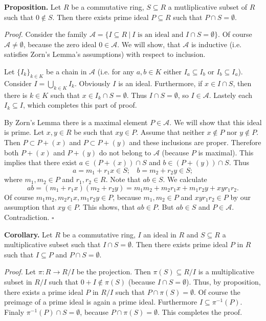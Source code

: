 \documentclass[12pt]{article}
\begin{document}
\textbf{Proposition.} Let $R$ be a commutative ring, $S\subseteq R$ a mutliplicative subset of $R$ such that $0\not\in S$. Then there exists prime ideal $P\subseteq R$ such that $P\cap S=\emptyset$.

\textit{Proof.} Consider the family $\mathcal{A}=\{I\subseteq R\ |\ I\mbox{ is an ideal and }I\cap S=\emptyset\}$. Of course $\mathcal{A}\neq\emptyset$, because the zero ideal $0\in\mathcal{A}$. We will show, that $\mathcal{A}$ is inductive (i.e. satisfies Zorn's Lemma's assumptions) with respect to inclusion.

Let $\{I_k\}_{k\in K}$ be a chain in $\mathcal{A}$ (i.e. for any $a,b\in K$ either $I_a\subseteq I_b$ or $I_b\subseteq I_a$). Consider $I=\bigcup_{k\in K}I_{k}$. Obviously $I$ is an ideal. Furthermore, if $x\in I\cap S$, then there is $k\in K$ such that $x\in I_k\cap S=\emptyset$. Thus $I\cap S=\emptyset$, so $I\in\mathcal{A}$. Lastely each $I_k\subseteq I$, which completes this part of proof.

By Zorn's Lemma there is a maximal element $P\in\mathcal{A}$. We will show that this ideal is prime. Let $x,y\in R$ be such that $xy\in P$. Assume that neither $x\not\in P$ nor $y\not\in P$. Then $P\subset P+(x)$ and $P\subset P+(y)$ and these inclusions are proper. Therefore both $P+(x)$ and $P+(y)$ do not belong to $\mathcal{A}$ (because $P$ is maximal). This implies that there exist $a\in (P+(x))\cap S$ and $b\in (P+(y))\cap S$. Thus
$$a=m_1+r_1x\in S;\ \ \ \ b=m_2+r_2y\in S;$$
where $m_1,m_2\in P$ and $r_1,r_2\in R$. Note that $ab\in S$. We calculate
$$ab=(m_1+r_1x)(m_2+r_2y)=m_1m_2+m_2r_1x+m_1r_2y+xyr_1r_2.$$
Of course $m_1m_2, m_2r_1x, m_1r_2y\in P$, because $m_1,m_2\in P$ and $xyr_1r_2\in P$ by our assumption that $xy\in P$. This shows, that $ab\in P$. But $ab\in S$ and $P\in\mathcal{A}$. Contradiction. $\square$

\textbf{Corollary.} Let $R$ be a commutative ring, $I$ an ideal in $R$ and $S\subseteq R$ a multiplicative subset such that $I\cap S=\emptyset$. Then there exists prime ideal $P$ in $R$ such that $I\subseteq P$ and $P\cap S=\emptyset$.

\textit{Proof.} Let $\pi:R\to R/I$ be the projection. Then $\pi(S)\subseteq R/I$ is a multiplicative subset in $R/I$ such that $0+I\not\in\pi(S)$ (because $I\cap S=\emptyset$). Thus, by proposition, there exists a prime ideal $P$ in $R/I$ such that $P\cap\pi(S)=\emptyset$. Of course the preimage of a prime ideal is again a prime ideal. Furthermore $I\subseteq\pi^{-1}(P)$. Finaly $\pi^{-1}(P)\cap S=\emptyset$, because $P\cap\pi(S)=\emptyset$. This completes the proof.
\end{document}
